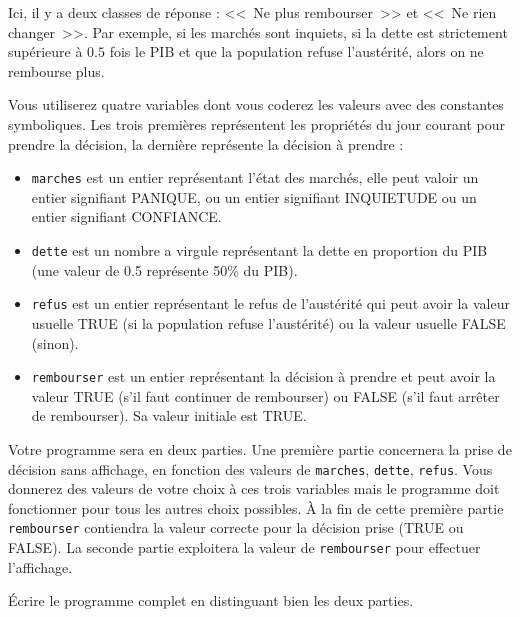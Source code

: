Ici, il y a deux classes de réponse : <<~Ne plus rembourser~>> et
<<~Ne rien changer~>>.
Par exemple, si les marchés sont inquiets, si la dette est
strictement supérieure à $0.5$ fois le PIB et que la population refuse
l'austérité, alors on ne rembourse plus.



Vous utiliserez quatre variables dont vous coderez les valeurs avec des
constantes symboliques. Les trois premières représentent les propriétés du jour
courant pour prendre la décision, la dernière représente la décision à
prendre :
  
\begin{itemize}
\item \verb|marches| est un entier représentant l'état des marchés,
  elle peut valoir un entier signifiant PANIQUE, ou un entier
  signifiant INQUIETUDE ou un entier signifiant CONFIANCE.
\item \verb|dette| est un nombre a virgule représentant la dette en
  proportion du PIB (une valeur de 0.5 représente 50\% du PIB).
\item \verb|refus| est un entier représentant le refus de l'austérité
  qui peut avoir la valeur usuelle
 TRUE (si la population refuse l'austérité) ou la valeur usuelle FALSE (sinon).
\item \verb|rembourser| est un entier représentant la décision à
  prendre et peut avoir la valeur TRUE (s'il faut continuer de
  rembourser) ou FALSE (s'il faut arrêter de rembourser). Sa valeur
  initiale est TRUE. 
\end{itemize}

Votre programme sera en deux parties. Une première partie concernera
la prise de décision sans affichage, en fonction
des valeurs de \verb|marches|, \verb|dette|, \verb|refus|. Vous
donnerez des valeurs de votre choix à ces trois variables mais le
programme doit fonctionner pour tous les autres choix possibles. À la fin
de cette première partie \verb|rembourser| contiendra la valeur
correcte pour la décision prise (TRUE ou FALSE). La seconde partie
exploitera la valeur de \verb|rembourser| pour effectuer l'affichage.

\question
Écrire le programme complet en distinguant bien les deux
parties.


